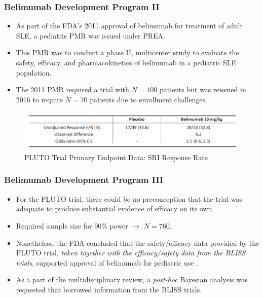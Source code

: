 \documentclass{beamer}
\begin{document}
\begin{frame} \frametitle{Belimumab Development Program II}
\begin{itemize}
			\item As part of the FDA's 2011 approval of belimumab for treatment of 
						adult SLE, a pediatric PMR was issued under PREA.
								
			\vspace{0.2cm}				
			\item This PMR was to conduct a phase II, multicenter study to evaluate the safety, 
						efficacy, and pharmacokinetics of belimumab in a pediatric SLE population.
						
			\vspace{0.2cm}			
			\item The 2011 PMR required a trial with $N=100$ patients but was 
			      reissued in 2016 to require $N=70$ patients due to enrollment challenges.
\end{itemize}

\vspace{-0.3cm}
\begin{figure}[h]
	\centering\includegraphics[scale=0.60]{./figures/PLUTO.pdf}  
	\vspace{-0.35cm}
	\caption{PLUTO Trial Primary Endpoint Data: SRI Response Rate} \label{PLUTO_DATA}
\end{figure}
\end{frame}
%
%
%
\begin{frame} \frametitle{Belimumab Development Program III}
\begin{itemize}
			\item For the PLUTO trial, there could be no preconception that the 
						trial was adequate to produce substantial evidence of efficacy 
						on its own. 		
								
			\vspace{0.5cm}
			\item Required sample size for 90\% power $\rightarrow$ $N=760$.
			
			\vspace{0.5cm}			
			\item Nonetheless, the FDA concluded that the safety/efficacy data provided by the PLUTO 
						trial, \textit{taken together with the efficacy/safety data from the BLISS 
						trials}, supported approval of belimumab for pediatric use 
						\citep{FDA127912}.					

			\vspace{0.5cm}			
			\item As a part of the multidisciplinary review, a \textit{post-hoc} Bayesian analysis was requested that
			      borrowed information from the BLISS trials.
						
\end{itemize}
\end{frame}
\end{document}
